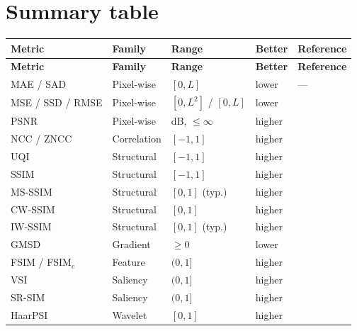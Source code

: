 \section{Summary table}

\begingroup
\small
\renewcommand{\arraystretch}{1.15}
\begin{longtable}{@{}p{3.7cm}p{2.3cm}p{3.2cm}p{1.5cm}p{2.3cm}@{}}
\toprule
\textbf{Metric} & \textbf{Family} & \textbf{Range} & \textbf{Better} & \textbf{Reference}\\
\midrule
\endfirsthead
\toprule
\textbf{Metric} & \textbf{Family} & \textbf{Range} & \textbf{Better} & \textbf{Reference}\\
\midrule
\endhead
\bottomrule
\endfoot
MAE / SAD           & Pixel-wise    & $[0,L]$              & lower  & --- \\
MSE / SSD / RMSE    & Pixel-wise    & $[0,L^2]$ / $[0,L]$  & lower  & \citep{wang2009mse}\\
PSNR                & Pixel-wise    & dB, $\le\infty$      & higher & \citep{huynh2008}\\
NCC / ZNCC          & Correlation   & $[-1,1]$             & higher & \citep{lewis1995}\\
UQI                 & Structural    & $[-1,1]$             & higher & \citep{wang2002uqi}\\
SSIM                & Structural    & $[-1,1]$             & higher & \citep{wang2004ssim}\\
MS-SSIM             & Structural    & $[0,1]$ (typ.)       & higher & \citep{wang2003msssim}\\
CW-SSIM             & Structural    & $[0,1]$              & higher & \citep{sampat2009cwssim}\\
IW-SSIM             & Structural    & $[0,1]$ (typ.)       & higher & \citep{wang2011iwssim}\\
GMSD                & Gradient      & $\ge0$               & lower  & \citep{xue2014gmsd}\\
FSIM / FSIM$_c$     & Feature       & $(0,1]$              & higher & \citep{zhang2011fsim}\\
VSI                 & Saliency      & $(0,1]$              & higher & \citep{zhang2014vsi}\\
SR-SIM              & Saliency      & $(0,1]$              & higher & \citep{zhang2012srsim}\\
HaarPSI             & Wavelet       & $[0,1]$              & higher & \citep{reisenhofer2018haarpsi}\\

\end{longtable}
